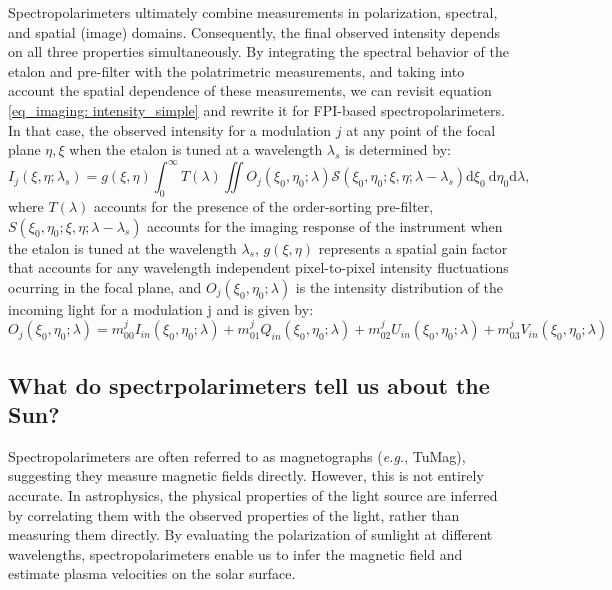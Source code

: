 Spectropolarimeters ultimately combine measurements in polarization, spectral, and spatial (image) domains. Consequently, the final observed intensity depends on all three properties simultaneously. By integrating the spectral behavior of the etalon and pre-filter with the polatrimetric measurements, and taking into account the spatial dependence of these measurements, we can revisit equation \eqref{eq_imaging: intensity_simple} and rewrite it for FPI-based spectropolarimeters. In that case, the observed intensity for a modulation $j$ at any point of the focal plane $\eta, \xi$ when the etalon is tuned at a wavelength $\lambda _ s$ is determined by:
\begin{equation}
  I_ j\left(\xi, \eta ; \lambda_{s}\right)=g(\xi, \eta)\int_{0}^{\infty} T(\lambda) \iint  O _ j\left(\xi_0, \eta_0 ; \lambda\right)  \mathcal{S}\left(\xi_0, \eta_0; \xi , \eta; \lambda-\lambda_{s}\right)  \mathrm{d} \xi_{0} \mathrm{~d} \eta_{0}\mathrm{d} \lambda ,
  \label{eq_spectro: General_Intensity}
\end{equation}
where $T(\lambda)$ accounts for the presence of the order-sorting pre-filter, $S\left(\xi_0, \eta_0; \xi , \eta; \lambda-\lambda_{s}\right)$ accounts for the imaging response of the instrument when the etalon is tuned at the wavelength $\lambda_{s}$, $g(\xi, \eta)$ represents a spatial gain factor that accounts for any wavelength independent pixel-to-pixel intensity fluctuations ocurring in the focal plane, and $O _ j(\xi_0, \eta_ 0;\lambda)$ is the intensity distribution of the incoming light for a modulation j and is given by:
\begin{equation}
  O _ j(\xi_0, \eta_ 0;\lambda) = m_{00} ^jI_{in}(\xi_0, \eta_ 0;\lambda) + m_{01}^jQ_{in}(\xi_0, \eta_ 0;\lambda) + m_{02}^jU_{in}(\xi_0, \eta_ 0;\lambda) + m_{03}^jV_{in}(\xi_0, \eta_ 0;\lambda)
\end{equation}
 
\subsection{What do spectrpolarimeters tell us about the Sun?}

Spectropolarimeters are often referred to as magnetographs (\textit{e.g.}, TuMag), suggesting they measure magnetic fields directly. However, this is not entirely accurate. In astrophysics, the physical properties of the light source are inferred by correlating them with the observed properties of the light, rather than measuring them directly. By evaluating the polarization of sunlight at different wavelengths, spectropolarimeters enable us to infer the magnetic field and estimate plasma velocities on the solar surface. 

